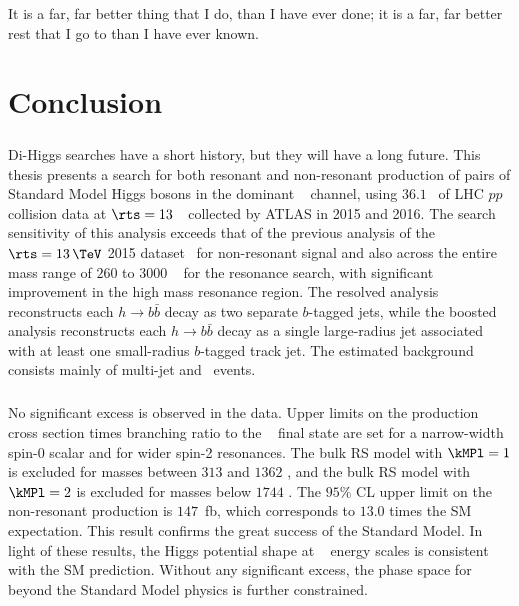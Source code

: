 \begin{savequote}[75mm]
It is a far, far better thing that I do, than I have ever done; it is a far, far better rest that I go to than I have ever known.
\end{savequote}

\chapter{Conclusion}
\label{conclusion}


\paragraph{}
Di-Higgs searches have a short history, but they will have a long future. 
This thesis presents a search for both resonant and non-resonant production of pairs of Standard Model Higgs bosons in the dominant \bbbb~ channel, using $36.1$ \ifb\ of LHC $pp$ collision data at $\rts = 13$~\TeV\ collected by ATLAS in 2015 and 2016. 
The search sensitivity of this analysis exceeds that of the previous analysis of the $\rts = 13\,\TeV$ 2015 dataset~\cite{EXOT-2015-11} for non-resonant signal and also across the entire mass range of $260$ to $3000$ \GeV~ for the resonance search, with significant improvement in the high mass resonance region. 
The resolved analysis reconstructs each $h \to b\bar{b}$ decay as two separate $b$-tagged jets, while the boosted analysis reconstructs each $h \to b\bar{b}$ decay as a single large-radius jet associated with at least one small-radius $b$-tagged track jet.
The estimated background consists mainly of multi-jet and \ttbar\ events.

\paragraph{}
No significant excess is observed in the data. 
Upper limits on the production cross section times branching ratio to the \bbbb~ final state are set for a narrow-width spin-0 scalar and for wider spin-2 resonances. 
The bulk RS model with $\kMPl = 1$ is excluded for masses between $313$ and $1362$ \GeV, and the bulk RS model with $\kMPl = 2$ is excluded for masses below $1744$ \GeV.
The $95\%$ CL upper limit on the non-resonant production is $147$~fb, which corresponds to $13.0$ times the SM expectation.
This result confirms the great success of the Standard Model.
In light of these results, the Higgs potential shape at \TeV~ energy scales is consistent with the SM prediction.
Without any significant excess, the phase space for beyond the Standard Model physics is further constrained.

